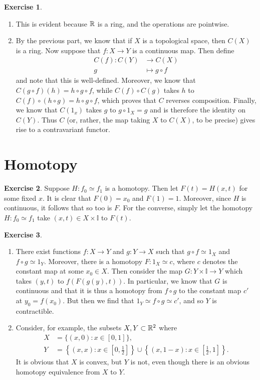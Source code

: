 \documentclass{article}
\theoremstyle{definition}
\newtheorem{intex}{Exercise}[section]
\newenvironment{exercise}{\begin{intex}\label{\theintex}}{\end{intex}}
\newcommand*\II{\mathbb I}
\begin{document}
\begin{exercise} \leavevmode
\begin{enumerate}
\item This is evident because $\mathbb{R}$ is a ring, and the operations are pointwise. 

\item By the previous part, we know that if $X$ is a topological space, then $C(X)$ is a ring. Now suppose that $f:X\to Y$ is a continuous map. Then define \begin{align*}C(f):C(Y)&\to C(X)\\g&\mapsto g\circ f\end{align*} and note that this is well-defined. Moreover, we know that $C(g\circ f)(h)=h\circ g\circ f$, while $C(f)\circ C(g)$ takes $h$ to $C(f)\circ(h\circ g)=h\circ g\circ f$, which proves that $C$ reverses composition. Finally, we know that $C(1_x)$ takes $g$ to $g\circ 1_X=g$ and is therefore the identity on $C(Y)$. Thus $C$ (or, rather, the map taking $X$ to $C(X)$, to be precise) gives rise to a contravariant functor. 
\end{enumerate}
\end{exercise} 

\section{Homotopy} 
\begin{exercise} \leavevmode
Suppose $H:f_0\simeq f_1$ is a homotopy. Then let $F(t)=H(x,t)$ for some fixed $x$. It is clear that $F(0)=x_0$ and $F(1)=1$. Moreover, since $H$ is continuous, it follows that so too is $F$. For the converse, simply let the homotopy $H:f_0\simeq f_1$ take $(x,t)\in X\times\II$ to $F(t)$. 
\end{exercise} 

\begin{exercise} \leavevmode
\begin{enumerate}
\item There exist functions $f:X\to Y$ and $g:Y\to X$ such that $g\circ f\simeq1_X$ and $f\circ g\simeq1_Y$. Moreover, there is a homotopy $F:1_X\simeq c$, where $c$ denotes the constant map at some $x_0\in X$. Then consider the map $G:Y\times\II\to Y$ which takes $(y,t)$ to $f(F(g(y),t))$. In particular, we know that $G$ is continuous and that it is thus a homotopy from $f\circ g$ to the constant map $c'$ at $y_0=f(x_0)$. But then we find that $1_Y\simeq f\circ g\simeq c'$, and so $Y$ is contractible. 

\item Consider, for example, the subsets $X,Y\subset\mathbb{R}^2$ where \begin{align*}X&=\{(x,0):x\in[0,1]\},\\Y&=\left\{(x,x):x\in\left[0,\frac12\right]\right\}\cup\left\{(x,1-x):x\in\left[\frac12,1\right]\right\}.\end{align*} It is obvious that $X$ is convex, but $Y$ is not, even though there is an obvious homotopy equivalence from $X$ to $Y$. 
\end{enumerate}
\end{exercise} 
\end{document}
